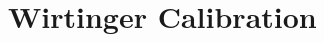 \documentclass[useAMS,usenatbib]{mn2e}
\newcommand{\conj}[1]{\overline{#1}}
\begin{document}
% 
% 

\section{Wirtinger Calibration}
\label{sec:p_statement}
\end{document}
